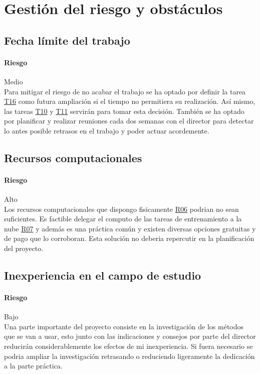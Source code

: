 
\chapter{Gestión del riesgo y obstáculos}\label{riskmanagement}
\section{Fecha límite del trabajo}
\subsubsection{Riesgo} Medio\\
Para mitigar el riesgo de no acabar el trabajo se ha optado por definir la tarea \hyperref[T16]{T16} 
como futura ampliación si el tiempo no permitiera su realización. Así mismo, las tareas \hyperref[T10]{T10} y
\hyperref[T11]{T11} servirán para tomar esta decisión.
También se ha optado por planificar y realizar reuniones cada dos semanas con el director
para detectar lo antes posible retrasos en el trabajo y poder actuar acordemente.

\section{Recursos computacionales}
\subsubsection{Riesgo} Alto\\
Los recursos computacionales que dispongo fisicamente \hyperref[R06]{R06} podrian no sean suficientes.
Es factible delegar el computo de las tareas de entrenamiento a la nube \hyperref[R07]{R07} y además
es una práctica común y existen diversas opciones gratuitas y de pago que lo corroboran.
Esta solución no deberia repercutir en la planificación del proyecto.

\section{Inexperiencia en el campo de estudio}
\subsubsection{Riesgo} Bajo\\
Una parte importante del proyecto consiste en la investigación de los métodos que se van a usar, esto
junto con las indicaciones y consejos por parte del director reducirán considerablemente los efectos
de mi inexperiencia.
Si fuera necesario se podria ampliar la investigación retrasando o reduciendo ligeramente la
dedicación a la parte práctica.


